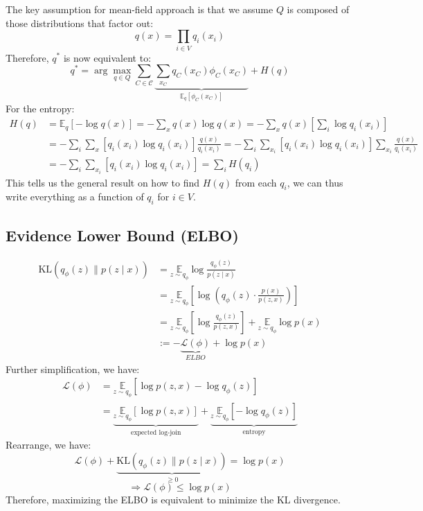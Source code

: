 The key assumption for mean-field approach is that we assume $Q$ is composed of those distributions that factor out:
$$q(x)=\prod_{i \in V} q_i\left(x_i\right)$$
Therefore, $q^*$ is now equivalent to:
$$
q^*=\arg \max _{q \in Q} \sum_{C \in \mathcal{C}} \underbrace{\sum_{x_C} q_C\left(x_C\right) \phi_C\left(x_C\right)}_{\mathbb{E}_q\left[\phi_C\left(x_C\right)\right]}+H(q)
$$
For the entropy:
$$
\begin{aligned}
H(q) & =\mathbb{E}_q[-\log q(x)]=-\sum_x q(x) \log q(x)=-\sum_x q(x)\left[\sum_i \log q_i\left(x_i\right)\right] \\
& =-\sum_i \sum_x\left[q_i\left(x_i\right) \log q_i\left(x_i\right)\right] \frac{q(x)}{q_i\left(x_i\right)}=-\sum_i \sum_{x_i}\left[q_i\left(x_i\right) \log q_i\left(x_i\right)\right] \sum_{x_i} \frac{q(x)}{q_i\left(x_i\right)} \\
& =-\sum_i \sum_{x_i}\left[q_i\left(x_i\right) \log q_i\left(x_i\right)\right]=\sum_i H\left(q_i\right)
\end{aligned}
$$
This tells us the general result on how to find $H(q)$ from each $q_i$, we can thus write everything as a function of $q_i$ for $i \in V$.

\subsection{Evidence Lower Bound (ELBO)}
\begin{align*} 
    \mathrm{KL}\left(q_\phi(z) \| p(z \mid x)\right) & =\underset{z \sim q_\phi}{\mathbb{E}} \log \frac{q_\phi(z)}{p(z \mid x)} \\ 
    & =\underset{z \sim q_\phi}{\mathbb{E}}\left[\log \left(q_\phi(z) \cdot \frac{p(x)}{p(z, x)}\right)\right] \\ 
    & =\underset{z \sim q_\phi}{\mathbb{E}}\left[\log \frac{q_\phi(z)}{p(z, x)}\right]+\underset{z \sim q_\phi}{\mathbb{E}} \log p(x) \\ 
    & :=-\underbrace{\mathcal{L}(\phi)}_{ELBO}+\log p(x)
\end{align*}
Further simplification, we have:
\begin{align*}
\mathcal{L}(\phi)&=\underset{z \sim q_\phi}{\mathbb{E}}\left[\log p(z, x)-\log q_\phi(z)\right]\\
&=\underbrace{\underset{z \sim q_\phi}{\mathbb{E}}[\log p(z, x)]}_{\text{expected log-join}}+\underbrace{\underset{z \sim q_\phi}{\mathbb{E}}\left[-\log q_\phi(z)\right]}_{\text{entropy}}
\end{align*}
Rearrange, we have:
$$\mathcal{L}(\phi)+\underbrace{\mathrm{KL}\left(q_\phi(z) \| p(z \mid x)\right)}_{\geq 0}=\log p(x)$$
$$\Rightarrow \mathcal{L}(\phi)\leq \log p(x)$$
Therefore, maximizing the ELBO is equivalent to minimize the KL divergence.